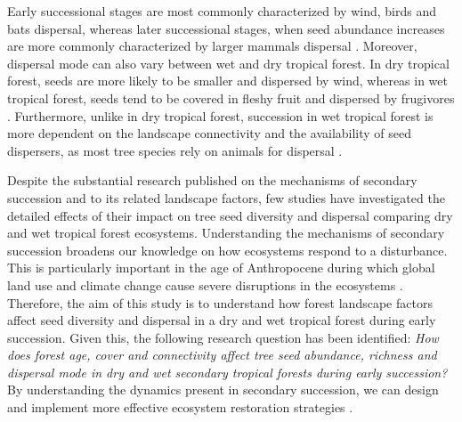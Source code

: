 Early successional stages are most commonly characterized by wind, birds and bats dispersal, whereas later successional stages, when seed abundance increases are more commonly characterized by larger mammals dispersal \citep{dentUnitingNicheDifferentiation2021}. Moreover, dispersal mode can also vary between wet and dry tropical forest. In dry tropical forest, seeds are more likely to be smaller and dispersed by wind, whereas in wet tropical forest, seeds tend to be covered in fleshy fruit and dispersed by frugivores \citep{vieiraPrinciplesNaturalRegeneration2006, dentUnitingNicheDifferentiation2021}. Furthermore, unlike in dry tropical forest, succession in wet tropical forest is more dependent on the landscape connectivity and the availability of seed dispersers, as most tree species rely on animals for dispersal \citep{hordijkLandUseHistory2024, lohbeckSuccessionalChangesFunctional2013}.


Despite the substantial research published on the mechanisms of secondary succession and to its related landscape factors, few studies have investigated the detailed effects of their impact on tree seed diversity and dispersal comparing dry and wet tropical forest ecosystems. Understanding the mechanisms of secondary succession broadens our knowledge on how ecosystems respond to a disturbance. This is particularly important in the age of Anthropocene during which global land use and climate change cause severe disruptions in the ecosystems \citep{poorterSuccessionalTheories2023}.  Therefore, the aim of this study is to understand how forest landscape factors affect seed diversity and dispersal in a dry and wet tropical forest during early succession. Given this, the following research question has been identified: \textit{How does forest age, cover and connectivity affect tree seed abundance, richness and dispersal mode in dry and wet secondary tropical forests during early succession?} By understanding the dynamics present in secondary succession, we can design and implement more effective ecosystem restoration strategies \citep{poorterSuccessionalTheories2023}.

